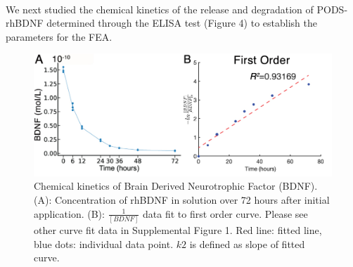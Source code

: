 \documentclass[review]{elsarticle}
\begin{document}
\indent We next studied the chemical kinetics of the release and degradation of PODS\textsuperscript{\textregistered}-rhBDNF determined through the ELISA test (Figure 4) to establish the parameters for the FEA. 
\begin{figure}
	\begin{center}
		\includegraphics[width=12.5cm]{Fig_4.jpg}
	\end{center}
	\caption{Chemical kinetics of Brain Derived Neurotrophic Factor (BDNF). (A): Concentration of rhBDNF in solution over 72 hours after initial application. (B): $\frac{1}{[BDNF]}$ data fit to first order curve. Please see other curve fit data in Supplemental Figure 1. Red line: fitted line, blue dots: individual data point. $k2$ is defined as slope of fitted curve.} 
\end{figure}
\end{document}
